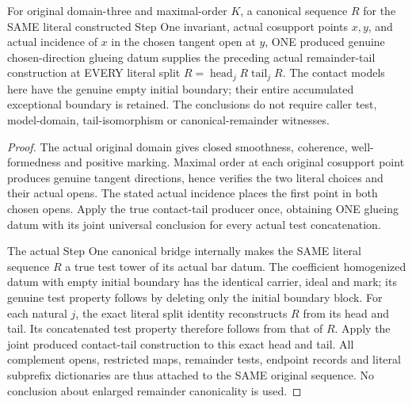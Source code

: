 \begin{theorem}
\label{hir:zero-contact-tail-original-literal-producer}
\leanok
{}
For original domain-three and maximal-order $K$, a canonical sequence $R$
for the SAME literal constructed Step One invariant, actual cosupport
points $x,y$, and actual incidence of $x$ in the chosen tangent open at
$y$, ONE produced genuine chosen-direction glueing datum supplies the
preceding actual remainder-tail construction at EVERY literal split
$R=\operatorname{head}_jR\operatorname{tail}_jR$. The contact models here
have the genuine empty initial boundary; their entire accumulated
exceptional boundary is retained. The conclusions do not require caller
test, model-domain, tail-isomorphism or canonical-remainder witnesses.
\end{theorem}
\begin{proof}
The actual original domain gives closed smoothness, coherence,
well-formedness and positive marking. Maximal order at each original
cosupport point produces genuine tangent directions, hence verifies
the two literal choices and their actual opens. The stated actual
incidence places the first point in both chosen opens. Apply the true
contact-tail producer once, obtaining ONE glueing datum with its
joint universal conclusion for every actual test concatenation.

The actual Step One canonical bridge internally makes the SAME literal
sequence $R$ a true test tower of its actual bar datum. The coefficient
homogenized datum with empty initial boundary has the identical carrier,
ideal and mark; its genuine test property follows by deleting only the
initial boundary block. For each natural $j$, the exact literal split
identity reconstructs $R$ from its head and tail. Its concatenated test
property therefore follows from that of $R$. Apply the joint produced
contact-tail construction to this exact head and tail. All complement
opens, restricted maps, remainder tests, endpoint records and literal
subprefix dictionaries are thus attached to the SAME original sequence.
No conclusion about enlarged remainder canonicality is used.
\end{proof}

